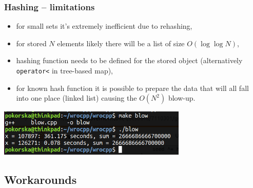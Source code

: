 \documentclass{beamer}
\begin{document}
\begin{frame}
    \frametitle{Hashing -- limitations}
    \pause
    \begin{itemize}
        \item for small sets it's extremely inefficient due to rehashing, \pause
        \item for stored $N$ elements likely there will be a list
            of size $O(\log \log N)$, \pause
        \item hashing function needs to be defined for the stored object
            (alternatively \texttt{operator<} in tree-based map), \pause
        \item for known hash function it is possible to prepare the data
            that will all fall into one place (linked list) causing
            the $O(N^2)$ blow-up. \pause
    \end{itemize}

    \begin{center}
    \includegraphics[width=9cm]{blow.png}
    \end{center}
\end{frame}

\subsection{Workarounds}

\end{document}
